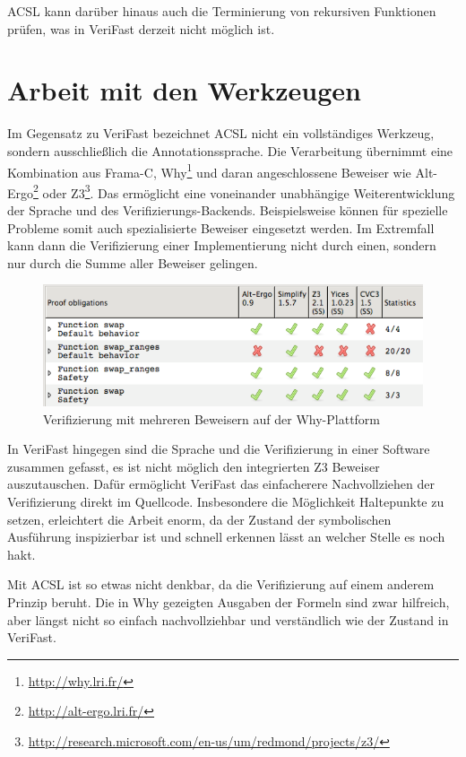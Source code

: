 ACSL kann darüber hinaus auch die Terminierung von rekursiven Funktionen prüfen, was in
VeriFast derzeit nicht möglich ist.


\section{Arbeit mit den Werkzeugen}

Im Gegensatz zu VeriFast bezeichnet ACSL nicht ein vollständiges Werkzeug, sondern ausschließlich
die Annotationssprache. Die Verarbeitung übernimmt eine Kombination aus Frama-C, Why\footnote{
\url{http://why.lri.fr/}} und daran angeschlossene Beweiser wie Alt-Ergo\footnote{\url{http://alt-ergo.lri.fr/}}
oder Z3\footnote{\url{http://research.microsoft.com/en-us/um/redmond/projects/z3/}}. Das ermöglicht 
eine voneinander unabhängige Weiterentwicklung der Sprache und des Verifizierungs-Backends. Beispielsweise 
können für spezielle Probleme somit auch spezialisierte Beweiser eingesetzt werden. Im Extremfall kann
dann die Verifizierung einer Implementierung nicht durch einen, sondern nur durch die Summe aller
Beweiser gelingen.

\begin{figure}[H]
	\centering
\includegraphics[width=1.0\textwidth]{images/why-multiple-provers.png}
\caption{Verifizierung mit mehreren Beweisern auf der Why-Plattform}
\end{figure}

In VeriFast hingegen sind die Sprache und die Verifizierung in einer Software zusammen gefasst,
es ist nicht möglich den integrierten Z3 Beweiser auszutauschen. Dafür ermöglicht VeriFast das
einfacherere Nachvollziehen der Verifizierung direkt im Quellcode. Insbesondere die Möglichkeit
Haltepunkte zu setzen, erleichtert die Arbeit enorm, da der Zustand der symbolischen Ausführung
inspizierbar ist und schnell erkennen lässt an welcher Stelle es noch hakt.

Mit ACSL ist so etwas nicht denkbar, da die Verifizierung auf einem anderem Prinzip beruht. Die
in Why gezeigten Ausgaben der Formeln sind zwar hilfreich, aber längst nicht so einfach nachvollziehbar und
verständlich wie der Zustand in VeriFast.

